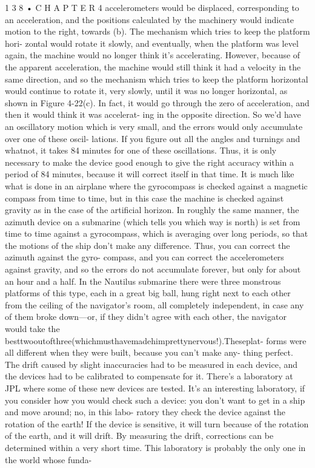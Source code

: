 \documentclass[10pt,oneside]{article}
\begin{document}
1 3 8 • C H A P T E R  4 accelerometers would be displaced, corresponding to an acceleration, and the positions calculated by the machinery would indicate motion to the right, towards (b). The mechanism which tries to keep the platform hori- zontal would rotate it slowly, and eventually, when the platform was level again, the machine would no longer think it’s accelerating. However, because of the apparent acceleration, the machine would still think it had a velocity in the same direction, and so the mechanism which tries to keep the platform horizontal would continue to rotate it, very slowly, until it was no longer horizontal, as shown in Figure 4-22(c). In fact, it would go through the zero of acceleration, and then it would think it was accelerat- ing in the opposite direction. So we’d have an oscillatory motion which is very small, and the errors would only accumulate over one of these oscil- lations. If you figure out all the angles and turnings and whatnot, it takes 84 minutes for one of these oscillations. Thus, it is only necessary to make the device good enough to give the right accuracy within a period of 84 minutes, because it will correct itself in that time. It is much like what is done in an airplane where the gyrocompass is checked against a magnetic compass from time to time, but in this case the machine is checked against gravity as in the case of the artificial horizon. In roughly the same manner, the azimuth device on a submarine (which tells you which way is north) is set from time to time against a gyrocompass, which is averaging over long periods, so that the motions of the ship don’t make any difference. Thus, you can correct the azimuth against the gyro- compass, and you can correct the accelerometers against gravity, and so the errors do not accumulate forever, but only for about an hour and a half. In the Nautilus submarine there were three monstrous platforms of this type, each in a great big ball, hung right next to each other from the ceiling of the navigator’s room, all completely independent, in case any of them broke down---or, if they didn’t agree with each other, the navigator would take the besttwooutofthree(whichmusthavemadehimprettynervous!).Theseplat- forms were all different when they were built, because you can’t make any- thing perfect. The drift caused by slight inaccuracies had to be measured in each device, and the devices had to be calibrated to compensate for it. There’s a laboratory at JPL where some of these new devices are tested. It’s an interesting laboratory, if you consider how you would check such a device: you don’t want to get in a ship and move around; no, in this labo- ratory they check the device against the rotation of the earth! If the device is sensitive, it will turn because of the rotation of the earth, and it will drift. By measuring the drift, corrections can be determined within a very short time. This laboratory is probably the only one in the world whose funda-\par
\end{document}
